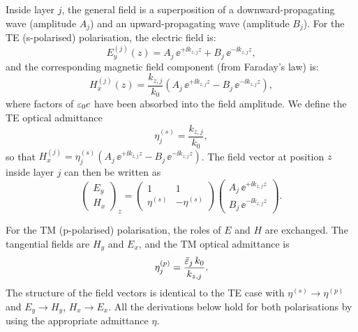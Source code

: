 Inside layer $j$, the general field is a superposition of a downward-propagating
wave (amplitude $A_j$) and an upward-propagating wave (amplitude $B_j$). For
the TE (s-polarised) polarisation, the electric field is:
\begin{equation}
  E_y^{(j)}(z) = A_j\,\ee^{+\ii k_{z,j} z} + B_j\,\ee^{-\ii k_{z,j} z},
  \label{eq:ch5_Ey}
\end{equation}
and the corresponding magnetic field component (from Faraday's law) is:
\begin{equation}
  H_x^{(j)}(z) = \frac{k_{z,j}}{k_0}\!\left(
    A_j\,\ee^{+\ii k_{z,j} z} - B_j\,\ee^{-\ii k_{z,j} z}
  \right),
  \label{eq:ch5_Hx}
\end{equation}
where factors of $\varepsilon_0 c$ have been absorbed into the field amplitude.
We define the TE optical admittance
\begin{equation}
  \eta_j^{(s)} = \frac{k_{z,j}}{k_0},
  \label{eq:ch5_eta_s}
\end{equation}
so that $H_x^{(j)} = \eta_j^{(s)}(A_j\,\ee^{+\ii k_{z,j} z} -
B_j\,\ee^{-\ii k_{z,j} z})$. The field vector at position $z$ inside layer $j$
can then be written as
\begin{equation}
  \begin{pmatrix} E_y \\ H_x \end{pmatrix}_z
  = \begin{pmatrix} 1 & 1 \\ \eta^{(s)} & -\eta^{(s)} \end{pmatrix}
    \begin{pmatrix} A_j\,\ee^{+\ii k_{z,j} z} \\ B_j\,\ee^{-\ii k_{z,j} z} \end{pmatrix}.
  \label{eq:ch5_field_vec}
\end{equation}

For the TM (p-polarised) polarisation, the roles of $E$ and $H$ are exchanged.
The tangential fields are $H_y$ and $E_x$, and the TM optical admittance is
\begin{equation}
  \eta_j^{(p)} = \frac{\tilde{\varepsilon}_j\,k_0}{k_{z,j}}.
  \label{eq:ch5_eta_p}
\end{equation}
The structure of the field vectors is identical to the TE case with
$\eta^{(s)} \to \eta^{(p)}$ and $E_y \to H_y$, $H_x \to E_x$. All the
derivations below hold for both polarisations by using the appropriate
admittance $\eta$.

